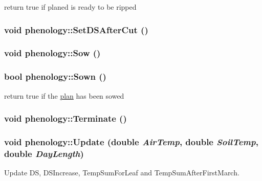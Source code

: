 return true if planed is ready to be ripped \hypertarget{classphenology_aca23c5511f877cde110a2ee69f98463d}{
\subsubsection[{SetDSAfterCut}]{\setlength{\rightskip}{0pt plus 5cm}void phenology::SetDSAfterCut ()}}
\label{classphenology_aca23c5511f877cde110a2ee69f98463d}
\hypertarget{classphenology_a2962099feafa721d4ee6db7131b6ca3e}{
\subsubsection[{Sow}]{\setlength{\rightskip}{0pt plus 5cm}void phenology::Sow ()}}
\label{classphenology_a2962099feafa721d4ee6db7131b6ca3e}
\hypertarget{classphenology_aa4986dd79d0fc195c3f1c21833171906}{
\subsubsection[{Sown}]{\setlength{\rightskip}{0pt plus 5cm}bool phenology::Sown ()}}
\label{classphenology_aa4986dd79d0fc195c3f1c21833171906}


return true if the \hyperlink{classplan}{plan} has been sowed \hypertarget{classphenology_af5db1bbe2f174a1ddef613c908b316a6}{
\subsubsection[{Terminate}]{\setlength{\rightskip}{0pt plus 5cm}void phenology::Terminate ()}}
\label{classphenology_af5db1bbe2f174a1ddef613c908b316a6}
\hypertarget{classphenology_a2e385ad05ba01687483faa3ec7de127c}{
\subsubsection[{Update}]{\setlength{\rightskip}{0pt plus 5cm}void phenology::Update (double {\em AirTemp}, \/  double {\em SoilTemp}, \/  double {\em DayLength})}}
\label{classphenology_a2e385ad05ba01687483faa3ec7de127c}
Update DS, DSIncrease, TempSumForLeaf and TempSumAfterFirstMarch. 

